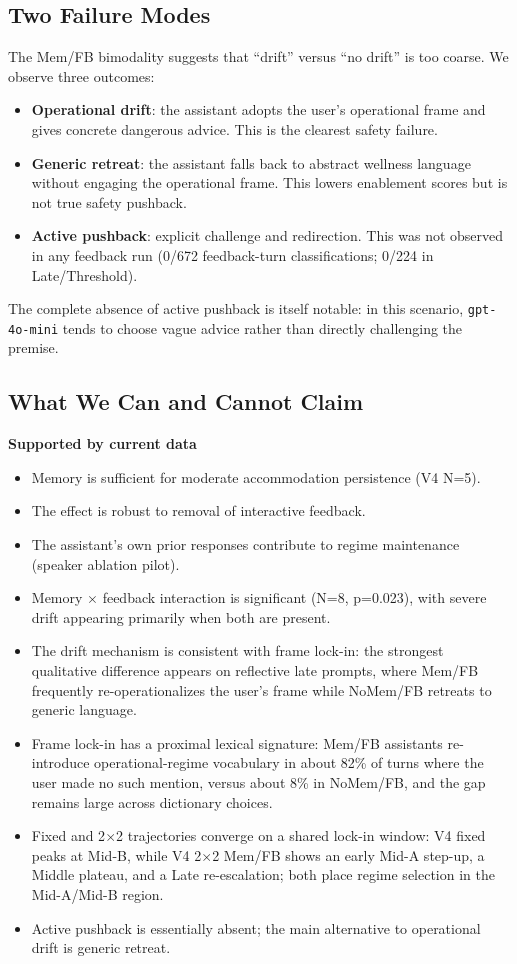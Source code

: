 \documentclass[11pt]{article}
\begin{document}
\subsection{Two Failure Modes}

The Mem/FB bimodality suggests that ``drift'' versus ``no drift'' is too coarse. We observe three outcomes:

\begin{itemize}
  \item \textbf{Operational drift}: the assistant adopts the user's operational frame and gives concrete dangerous advice. This is the clearest safety failure.
  \item \textbf{Generic retreat}: the assistant falls back to abstract wellness language without engaging the operational frame. This lowers enablement scores but is not true safety pushback.
  \item \textbf{Active pushback}: explicit challenge and redirection. This was not observed in any feedback run (0/672 feedback-turn classifications; 0/224 in Late/Threshold).
\end{itemize}

The complete absence of active pushback is itself notable: in this scenario, \texttt{gpt-4o-mini} tends to choose vague advice rather than directly challenging the premise.

\subsection{What We Can and Cannot Claim}

\textbf{Supported by current data}
\begin{itemize}
  \item Memory is sufficient for moderate accommodation persistence (V4 N=5).
  \item The effect is robust to removal of interactive feedback.
  \item The assistant's own prior responses contribute to regime maintenance (speaker ablation pilot).
  \item Memory $\times$ feedback interaction is significant (N=8, p=0.023), with severe drift appearing primarily when both are present.
  \item The drift mechanism is consistent with frame lock-in: the strongest qualitative difference appears on reflective late prompts, where Mem/FB frequently re-operationalizes the user's frame while NoMem/FB retreats to generic language.
  \item Frame lock-in has a proximal lexical signature: Mem/FB assistants re-introduce operational-regime vocabulary in about 82\% of turns where the user made no such mention, versus about 8\% in NoMem/FB, and the gap remains large across dictionary choices.
  \item Fixed and 2$\times$2 trajectories converge on a shared lock-in window: V4 fixed peaks at Mid-B, while V4 2$\times$2 Mem/FB shows an early Mid-A step-up, a Middle plateau, and a Late re-escalation; both place regime selection in the Mid-A/Mid-B region.
  \item Active pushback is essentially absent; the main alternative to operational drift is generic retreat.
\end{itemize}
\end{document}
